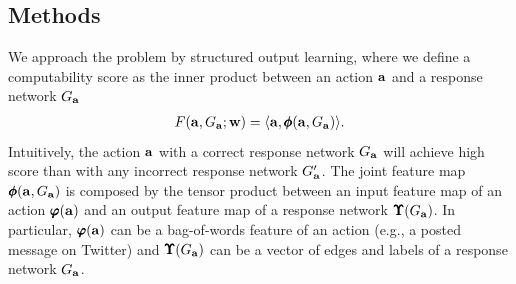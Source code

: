 {%
\subsection{Methods}
We approach the problem by structured output learning, where we define a computability score as the inner product between an action $\mathbf {a}$ and a response network $G_{\mathbf {a}}$
\begin{align*}
	F(\mathbf {a},G_{\mathbf {a}};\mathbf {w}) = \langle \mathbf {a}, \pmb \phi(\mathbf {a},G_{\mathbf {a}}) \rangle.
\end{align*}
Intuitively, the action $\mathbf {a}$ with a correct response network $G_{\mathbf {a}}$ will achieve high score than with any incorrect response network $G_{\mathbf {a}}'$.
The joint feature map $\pmb \phi(\mathbf {a},G_{\mathbf {a}})$ is composed by the tensor product between an input feature map of an action $\pmb \varphi(\mathbf {a})$ and an output feature map of a response network $\pmb \Upsilon(G_{\mathbf {a}})$.
In particular, $\pmb \varphi(\mathbf {a})$ can be a bag-of-words feature of an action (e.g., a posted message on Twitter) and $\pmb \Upsilon(G_{\mathbf {a}})$ can be a vector of edges and labels of a response network $G_{\mathbf {a}}$.

}

